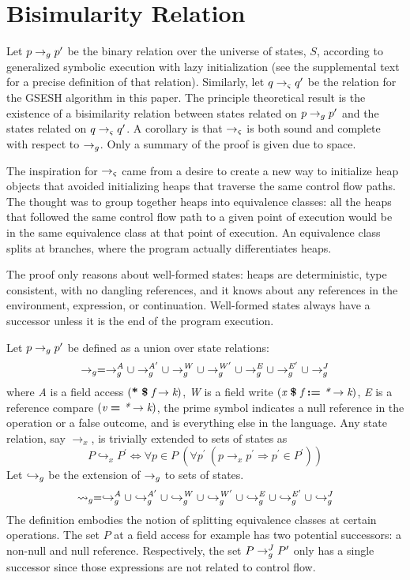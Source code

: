 \section{Bisimularity Relation}
Let $p \rightarrow_{g} p^\prime$ be the binary relation over the universe of states, $S$,
according to generalized symbolic execution with lazy initialization
(see the supplemental text for a precise definition of that
relation). Similarly, let $q \rightarrow_{\varsigma} q^\prime$ be the relation for the GSESH
algorithm in this paper. The principle theoretical result is the
existence of a bisimilarity relation between states related on $p \rightarrow_{g} p^\prime$
and the states related on $q \rightarrow_{\varsigma} q^\prime$. A corollary is that $\rightarrow_{\varsigma}$ is
both sound and complete with respect to $\rightarrow_{g}$. Only a summary of the
proof is given due to space.

The inspiration for $\rightarrow_{\varsigma}$ came from a desire to create
a new way to initialize heap objects that avoided initializing heaps
that traverse the same control flow paths. The thought was to group together heaps
into equivalence classes: all the heaps that followed the same control
flow path to a given point of execution would be in the same
equivalence class at that point of execution. An equivalence class
splits at branches, where the program actually differentiates heaps.

The proof only reasons about well-formed states: heaps are
deterministic, type consistent, with no dangling references, and it
knows about any references in the environment, expression, or
continuation. Well-formed states always have a successor unless it is
the end of the program execution.

Let $p \rightarrow_{g} p^\prime$ be defined as a union over state relations:
$$
\rightarrow_{g} = \rightarrow_{g}^\mathit{A} \cup  \rightarrow_{g}^\mathit{A^\prime} \cup \rightarrow_{g}^\mathit{W} \cup \rightarrow_{g}^\mathit{W^\prime} \cup \rightarrow_{g}^\mathit{E} \cup \rightarrow_{g}^\mathit{E^\prime} \cup \rightarrow_{g}^{J}
$$
where \emph{A} is a field access $\lp \cfgt{*}\ \cfgt{\$}\ \cfgnt{f}
\rightarrow \cfgnt{k}\rp$, \emph{W} is a field write $(
\emph{x}\ \textbf{\$}\ \emph{f}\ \textbf{:=}\ \emph{*} \rightarrow
\emph{k})$, \emph{E} is a reference compare $(
\emph{v}\ \textbf{=}\ \emph{*} \rightarrow \emph{k})$, the prime symbol
indicates a null reference in the operation or a false outcome, and
\emph{\com} is everything else in the language. Any state relation, say $\rightarrow_x$, is trivially extended to sets of states as
$$
P \hookrightarrow_x P^\prime \Longleftrightarrow \forall p \in P\ (\forall p^\prime\ (p \rightarrow_x p^\prime \Rightarrow p^\prime \in P^\prime))
$$
Let $\hookrightarrow_{g}$ be the extension of $\rightarrow_{g}$ to sets of states.
$$
\leadsto_{g} = \hookrightarrow_{g}^\mathit{A}
\cup \hookrightarrow_{g}^\mathit{A^\prime} \cup \hookrightarrow_{g}^\mathit{W} \cup
\hookrightarrow_{g}^\mathit{W^\prime} \cup \hookrightarrow_{g}^\mathit{E} \cup \hookrightarrow_{g}^\mathit{E^\prime}
\cup \hookrightarrow_{g}^{J}
$$
The definition embodies the notion of splitting equivalence classes at
certain operations. The set $P$ at a field access for example has two
potential successors: a non-null and null reference. Respectively, the
set $P \rightarrow_{g}^{J} P^\prime$ only has a single successor since those expressions
are not related to control flow.

